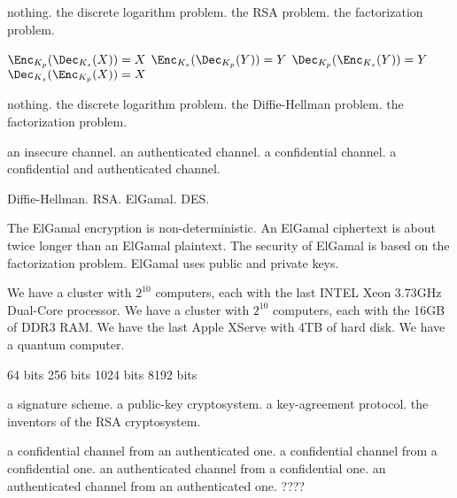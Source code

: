  
 {nothing.}%
 {the discrete logarithm problem.}%
 {the RSA problem.}%
 {the factorization problem.}%
 
 {$\Enc_{K_p}(\Dec_{K_s}(X))=X$}%
 {$\Enc_{K_s}(\Dec_{K_p}(Y))=Y$}%
 {$\Dec_{K_p}(\Enc_{K_s}(Y))=Y$}%
 {$\Dec_{K_s}(\Enc_{K_p}(X))=X$}%
 
 {nothing.}%
 {the discrete logarithm problem.}%
 {the Diffie-Hellman problem.}%
 {the factorization problem.}%

 {an insecure channel.}%
 {an authenticated channel.}%
 {a confidential channel.}%
 {a confidential and authenticated channel.}%
 
 {Diffie-Hellman.}%
 {RSA.}%
 {ElGamal.}%
 {DES.}%
 
 {The ElGamal encryption is non-deterministic.}%
 {An ElGamal ciphertext is about twice longer than an ElGamal plaintext.}%
 {The security of ElGamal is based on the factorization problem.}%
 {ElGamal uses public and private keys.}%
 
{We have a cluster with $2^{10}$ computers, each with the last INTEL Xeon 3.73GHz Dual-Core processor.}%
{We have a cluster with $2^{10}$ computers, each with the 16GB of DDR3 RAM.}%
{We have the last Apple XServe with 4TB of hard disk.}%
{We have a quantum computer.}%

{64 bits}
{256 bits}
{1024 bits}
{8192 bits}

{a signature scheme.}
{a public-key cryptosystem.}
{a key-agreement protocol.}
{the inventors of the RSA cryptosystem.}


{a confidential channel from an authenticated one.}
{a confidential channel from a confidential one.}
{an authenticated channel from a confidential one.}
{an authenticated channel from an authenticated one.}
????

